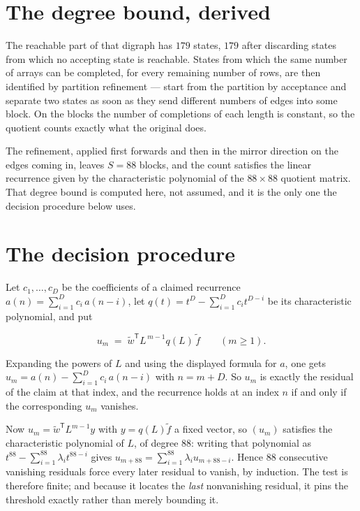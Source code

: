 \documentclass[11pt]{article}
\theoremstyle{definition}
\begin{document}
\section{The degree bound, derived}

The reachable part of that digraph has $179$ states, $179$ after discarding states from which no accepting state is reachable. States from which the same number of arrays can be completed, for every remaining number of rows, are then identified by partition refinement --- start from the partition by acceptance and separate two states as soon as they send different numbers of edges into some block. On the blocks the number of completions of each length is constant, so the quotient counts exactly what the original does.

The refinement, applied first forwards and then in the mirror direction on the edges coming in, leaves $S = 88$ blocks, and the count satisfies the linear recurrence given by the characteristic polynomial of the $88 \times 88$ quotient matrix. That degree bound is computed here, not assumed, and it is the only one the decision procedure below uses.

\section{The decision procedure}

Let $c_1,\dots,c_D$ be the coefficients of a claimed recurrence $a(n) = \sum_{i=1}^{D} c_i\,a(n-i)$, let $q(t) = t^{D} - \sum_{i=1}^{D} c_i t^{D-i}$ be its characteristic polynomial, and put

\[u_m \;=\; \tilde w^{\mathsf T} L^{\,m-1} q(L)\,\tilde f \qquad (m \ge 1).\]

Expanding the powers of $L$ and using the displayed formula for $a$, one gets $u_m = a(n) - \sum_{i=1}^{D} c_i\,a(n-i)$ with $n = m + D$. So $u_m$ is exactly the residual of the claim at that index, and the recurrence holds at an index $n$ if and only if the corresponding $u_m$ vanishes.

Now $u_m = \tilde w^{\mathsf T} L^{m-1} y$ with $y = q(L)\tilde f$ a fixed vector, so $(u_m)$ satisfies the characteristic polynomial of $L$, of degree $88$: writing that polynomial as $t^{88} - \sum_{i=1}^{88} \lambda_i t^{88-i}$ gives $u_{m+88} = \sum_{i=1}^{88} \lambda_i u_{m+88-i}$. Hence $88$ consecutive vanishing residuals force every later residual to vanish, by induction. The test is therefore finite; and because it locates the {\itshape last} nonvanishing residual, it pins the threshold exactly rather than merely bounding it.
\end{document}
